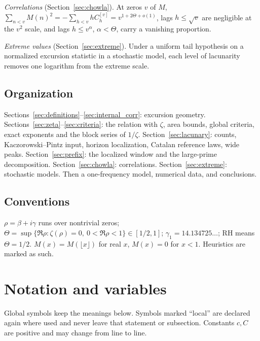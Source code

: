 \documentclass[11pt,reqno]{amsart}
\numberwithin{equation}{section}
\theoremstyle{plain}
\theoremstyle{definition}
\theoremstyle{remark}
\begin{document}
\emph{Correlations} (Section~\ref{sec:chowla}). At zeros $v$ of $M$,
$\sum_{n<v}M(n)^2=-\sum_{h<v}hC_h^{[v]}=v^{1+2\Theta+o(1)}$, lags
$h\le\sqrt v$ are negligible at the $v^2$ scale, and lags $h\le v^\alpha$,
$\alpha<\Theta$, carry a vanishing proportion.

\emph{Extreme values} (Section~\ref{sec:extreme}). Under a uniform tail
hypothesis on a normalized excursion statistic in a stochastic model, each
level of lacunarity removes one logarithm from the extreme scale.

\subsection{Organization}
\label{subsec:organization}
Sections~\ref{sec:definitions}--\ref{sec:internal_corr}: excursion geometry.
Sections~\ref{sec:zeta}--\ref{sec:criteria}: the relation with $\zeta$, area
bounds, global criteria, exact exponents and the block series of $1/\zeta$.
Section~\ref{sec:lacunary}: counts, Kaczorowski--Pintz input, horizon
localization, Catalan reference laws, wide peaks.
Section~\ref{sec:prefix}: the localized window and the large-prime
decomposition. Section~\ref{sec:chowla}: correlations.
Section~\ref{sec:extreme}: stochastic models. Then a one-frequency model,
numerical data, and conclusions.

\subsection*{Conventions}
$\rho=\beta+i\gamma$ runs over nontrivial zeros;
$\Theta=\sup\{\Re\rho:\zeta(\rho)=0,\ 0<\Re\rho<1\}\in[1/2,1]$;
$\gamma_1=14.134725\ldots$; RH means $\Theta=1/2$. $M(x)=M(\lfloor x\rfloor)$
for real $x$, $M(x)=0$ for $x<1$. Heuristics are marked as such.

\section{Notation and variables}
\label{sec:notation}

Global symbols keep the meanings below. Symbols marked ``local'' are
declared again where used and never leave that statement or subsection.
Constants $c,C$ are positive and may change from line to line.
\end{document}
